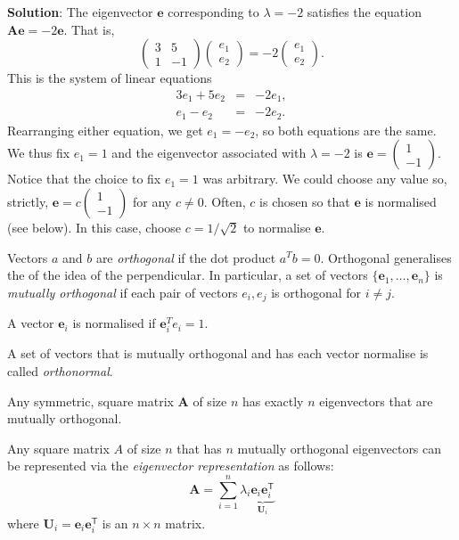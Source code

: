{\bf Solution}: The eigenvector  $\mathbf e$ corresponding to $\lambda = -2$ satisfies the equation $\mathbf{Ae} = -2 \mathbf e$.  That is,
\[ \left(\begin{array}{ll}3 & 5\\1&-1\end{array}\right)  \left( \begin{array}{c} e_1 \\ e_2 \end{array}\right) = -2 \left( \begin{array}{c} e_1 \\ e_2 \end{array}\right).\]
This is the system of linear equations \begin{eqnarray}  3e_1 + 5e_2 &=& -2e_1, \\ e_1 - e_2 &=& -2 e_2. \label{eqn:eigenvec} \end{eqnarray}
Rearranging either equation, we get $e_1 = -e_2$, so both equations are the same.  We thus fix $e_1 = 1$ and the eigenvector associated with $\lambda = -2$ is $\mathbf e = \left( \begin{array}{c} 1 \\ -1 \end{array}\right)$.  Notice that the choice to fix  $e_1 = 1$ was arbitrary.  We could choose any value so, strictly, $\mathbf e =  c\left( \begin{array}{c} 1 \\ -1 \end{array}\right)$ for any $c \neq 0$.  Often, $c$ is chosen so that $\mathbf e$ is normalised (see below).  In this case, choose $c = 1/\sqrt 2$ to normalise $\mathbf e$. \sqend



Vectors $a$ and $b$ are {\em orthogonal} if the dot product $a^Tb = 0$.  Orthogonal generalises the of the idea of the perpendicular.  In particular, a set of vectors $\{ \mathbf e_1, \ldots, \mathbf e_n \}$ is {\em mutually orthogonal} if each pair of vectors $e_i, e_j$ is orthogonal for $i \ne j$.

A vector $\mathbf e_i$ is normalised if $\mathbf e_i^T e_i = 1$.

A set of vectors that is mutually orthogonal and has each vector normalise is called {\em orthonormal}. 


Any symmetric, square matrix $\mathbf A$ of size $n$ has exactly $n$ eigenvectors that are mutually orthogonal.


 

Any square matrix $A$ of size $n$ that has $n$ mutually orthogonal eigenvectors can be represented via the {\em eigenvector representation} as follows: 
\[
\mathbf{A} = \sum\limits_{i=1}^n \lambda_i\underbrace{\mathbf{e}_i\mathbf{e}_i^{\mathsf{T}}}_{\mathbf{U}_i}
\]
where $\mathbf{U}_i=\mathbf{e}_i\mathbf{e}_i^{\mathsf{T}}$ is an $n\times n$ matrix.



